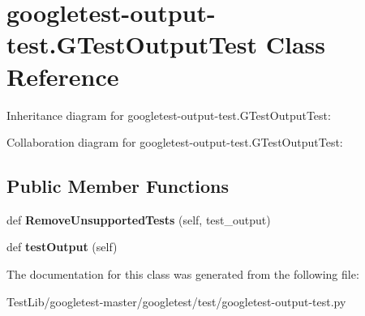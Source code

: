 \hypertarget{classgoogletest-output-test_1_1GTestOutputTest}{}\section{googletest-\/output-\/test.G\+Test\+Output\+Test Class Reference}
\label{classgoogletest-output-test_1_1GTestOutputTest}


Inheritance diagram for googletest-\/output-\/test.G\+Test\+Output\+Test\+:


Collaboration diagram for googletest-\/output-\/test.G\+Test\+Output\+Test\+:
\subsection*{Public Member Functions}
\begin{DoxyCompactItemize}
\item 
\mbox{\label{classgoogletest-output-test_1_1GTestOutputTest_af058c7917b05d06b0e6249061db264a3}} 
def {\bfseries Remove\+Unsupported\+Tests} (self, test\+\_\+output)
\item 
\mbox{\label{classgoogletest-output-test_1_1GTestOutputTest_a4ab77925377e6c837d33f07960a31212}} 
def {\bfseries test\+Output} (self)
\end{DoxyCompactItemize}


The documentation for this class was generated from the following file\+:\begin{DoxyCompactItemize}
\item 
Test\+Lib/googletest-\/master/googletest/test/googletest-\/output-\/test.\+py\end{DoxyCompactItemize}
